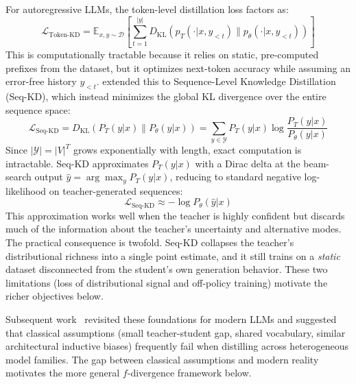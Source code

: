 \documentclass{article} %
\newcommand{\E}{\mathbb{E}}
\newcommand{\KL}{D_{\mathrm{KL}}}
\newcommand{\ptheta}{p_\theta}
\newcommand{\pteacher}{p_T}
\newcommand{\loss}{\mathcal{L}}
\begin{document}
For autoregressive LLMs, the token-level distillation loss factors as:
\begin{equation}
    \loss_{\text{Token-KD}} = \E_{x, y \sim \mathcal{D}} \left[ \sum_{t=1}^{|y|} \KL(\pteacher(\cdot | x, y_{<t}) \parallel \ptheta(\cdot | x, y_{<t})) \right]
\end{equation}
This is computationally tractable because it relies on static, pre-computed prefixes from the dataset, but it optimizes next-token accuracy while assuming an error-free history $y_{<t}$. \citet{1606.07947} extended this to Sequence-Level Knowledge Distillation (Seq-KD), which instead minimizes the global KL divergence over the entire sequence space:
\begin{equation}
    \loss_{\text{Seq-KD}} = \KL(P_T(y|x) \parallel P_\theta(y|x)) = \sum_{y \in \mathcal{Y}} P_T(y|x) \log \frac{P_T(y|x)}{P_\theta(y|x)}
\end{equation}
Since $|\mathcal{Y}| = |V|^T$ grows exponentially with length, exact computation is intractable. Seq-KD approximates $P_T(y|x)$ with a Dirac delta at the beam-search output $\hat{y} = \arg\max_y P_T(y|x)$, reducing to standard negative log-likelihood on teacher-generated sequences:
\begin{equation}
    \loss_{\text{Seq-KD}} \approx -\log P_\theta(\hat{y}|x)
\end{equation}
This approximation works well when the teacher is highly confident but discards much of the information about the teacher's uncertainty and alternative modes. The practical consequence is twofold. Seq-KD collapses the teacher's distributional richness into a single point estimate, and it still trains on a \emph{static} dataset disconnected from the student's own generation behavior. These two limitations (loss of distributional signal and off-policy training) motivate the richer objectives below.

Subsequent work~\citep{2402.11890} revisited these foundations for modern LLMs and suggested that classical assumptions (small teacher-student gap, shared vocabulary, similar architectural inductive biases) frequently fail when distilling across heterogeneous model families. The gap between classical assumptions and modern reality motivates the more general $f$-divergence framework below.
\end{document}
